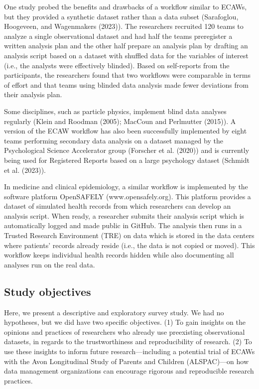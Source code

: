 \documentclass[
  man,floatsintext]{apa6}
\begin{document}
One study probed the benefits and drawbacks of a workflow similar to ECAWs, but they provided a synthetic dataset rather than a data subset (Sarafoglou, Hoogeveen, and Wagenmakers (2023)). The researchers recruited 120 teams to analyze a single observational dataset and had half the teams preregister a written analysis plan and the other half prepare an analysis plan by drafting an analysis script based on a dataset with shuffled data for the variables of interest (i.e., the analysts were effectively blinded). Based on self-reports from the participants, the researchers found that two workflows were comparable in terms of effort and that teams using blinded data analysis made fewer deviations from their analysis plan.

Some disciplines, such as particle physics, implement blind data analyses regularly (Klein and Roodman (2005); MacCoun and Perlmutter (2015)). A version of the ECAW workflow has also been successfully implemented by eight teams performing secondary data analysis on a dataset managed by the Psychological Science Accelerator group (Forscher et al. (2020)) and is currently being used for Registered Reports based on a large psychology dataset (Schmidt et al. (2023)).

In medicine and clinical epidemiology, a similar workflow is implemented by the software platform OpenSAFELY (www.opensafely.org). This platform provides a dataset of simulated health records from which researchers can develop an analysis script. When ready, a researcher submits their analysis script which is automatically logged and made public in GitHub. The analysis then runs in a Trusted Research Environment (TRE) on data which is stored in the data centers where patients' records already reside (i.e., the data is not copied or moved). This workflow keeps individual health records hidden while also documenting all analyses run on the real data.

\hypertarget{study-objectives}{%
\subsection{Study objectives}\label{study-objectives}}

Here, we present a descriptive and exploratory survey study. We had no hypotheses, but we did have two specific objectives. (1) To gain insights on the opinions and practices of researchers who already use preexisting observational datasets, in regards to the trustworthiness and reproducibility of research. (2) To use these insights to inform future research---including a potential trial of ECAWs with the Avon Longitudinal Study of Parents and Children (ALSPAC)---on how data management organizations can encourage rigorous and reproducible research practices.
\end{document}
